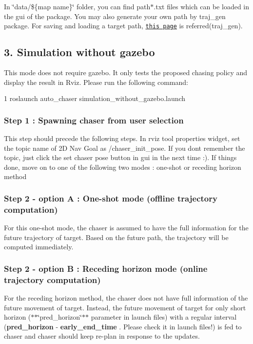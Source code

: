 In \char`\"{}data/\$\{map name\}\char`\"{} folder, you can find path$\ast$.txt files which can be loaded in the gui of the package. You may also generate your own path by traj\+\_\+gen package. For saving and loading a target path, \href{https://github.com/icsl-Jeon/traj_gen}{\tt this page} is referred(traj\+\_\+gen). \label{_without}%
 \subsection*{3. Simulation without gazebo}

This mode does not require gazebo. It only tests the proposed chasing policy and display the result in Rviz. Please run the following command\+:


\begin{DoxyCode}
1 roslaunch auto\_chaser simulation\_without\_gazebo.launch
\end{DoxyCode}


\subsubsection*{Step 1 \+: Spawning chaser from user selection}

This step should precede the following steps. In rviz tool properties widget, set the topic name of 2D Nav Goal as /chaser\+\_\+init\+\_\+pose. If you don\textquotesingle{}t remember the topic, just click the {\ttfamily set chaser pose button} in gui in the next time \+:). If things done, move on to one of the following two modes \+: one-\/shot or receding horizon method

\subsubsection*{Step 2 -\/ option A \+: One-\/shot mode (offline trajectory computation)}



For this one-\/shot mode, the chaser is assumed to have the full information for the future trajectory of target. Based on the future path, the trajectory will be computed immediately.

\subsubsection*{Step 2 -\/ option B \+: Receding horizon mode (online trajectory computation)}



For the receding horizon method, the chaser does not have full information of the future movement of target. Instead, the future movement of target for only short horizon ($\ast$$\ast$\char`\"{}pred\+\_\+horizon\char`\"{}$\ast$$\ast$ parameter in launch files) with a regular interval ({\bfseries pred\+\_\+horizon} -\/ {\bfseries early\+\_\+end\+\_\+time} . Please check it in launch files!) is fed to chaser and chaser should keep re-\/plan in response to the updates.

